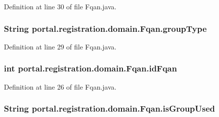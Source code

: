 Definition at line 30 of file Fqan.java.

\hypertarget{classportal_1_1registration_1_1domain_1_1Fqan_ab172b872fc284fb1f5c0ebb198a5c98a}{
\subsubsection[{groupType}]{\setlength{\rightskip}{0pt plus 5cm}String {\bf portal.registration.domain.Fqan.groupType}}}
\label{classportal_1_1registration_1_1domain_1_1Fqan_ab172b872fc284fb1f5c0ebb198a5c98a}


Definition at line 29 of file Fqan.java.

\hypertarget{classportal_1_1registration_1_1domain_1_1Fqan_ad84508e79770bdb6de564d288f498ac6}{
\subsubsection[{idFqan}]{\setlength{\rightskip}{0pt plus 5cm}int {\bf portal.registration.domain.Fqan.idFqan}}}
\label{classportal_1_1registration_1_1domain_1_1Fqan_ad84508e79770bdb6de564d288f498ac6}


Definition at line 26 of file Fqan.java.

\hypertarget{classportal_1_1registration_1_1domain_1_1Fqan_a18a759a4901fefe12b28418fd4fc054c}{
\subsubsection[{isGroupUsed}]{\setlength{\rightskip}{0pt plus 5cm}String {\bf portal.registration.domain.Fqan.isGroupUsed}}}
\label{classportal_1_1registration_1_1domain_1_1Fqan_a18a759a4901fefe12b28418fd4fc054c}


